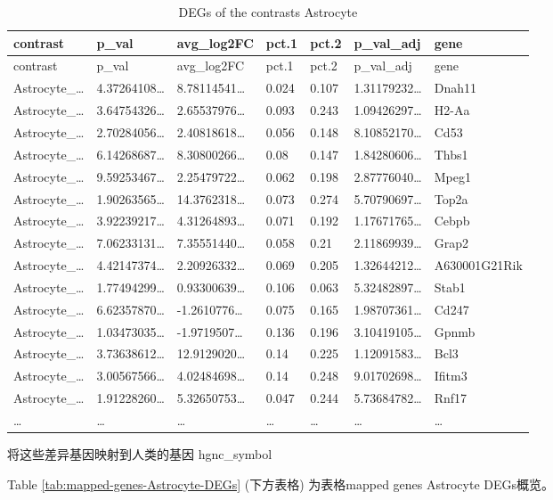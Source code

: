 \documentclass[
]{article}
\begin{document}
\begin{longtable}[]{@{}lllllll@{}}
\caption{\label{tab:DEGs-of-the-contrasts-Astrocyte}DEGs of the contrasts Astrocyte}\tabularnewline
\toprule
contrast & p\_val & avg\_log2FC & pct.1 & pct.2 & p\_val\_adj & gene\tabularnewline
\midrule
\endfirsthead
\toprule
contrast & p\_val & avg\_log2FC & pct.1 & pct.2 & p\_val\_adj & gene\tabularnewline
\midrule
\endhead
Astrocyte\_\ldots{} & 4.37264108\ldots{} & 8.78114541\ldots{} & 0.024 & 0.107 & 1.31179232\ldots{} & Dnah11\tabularnewline
Astrocyte\_\ldots{} & 3.64754326\ldots{} & 2.65537976\ldots{} & 0.093 & 0.243 & 1.09426297\ldots{} & H2-Aa\tabularnewline
Astrocyte\_\ldots{} & 2.70284056\ldots{} & 2.40818618\ldots{} & 0.056 & 0.148 & 8.10852170\ldots{} & Cd53\tabularnewline
Astrocyte\_\ldots{} & 6.14268687\ldots{} & 8.30800266\ldots{} & 0.08 & 0.147 & 1.84280606\ldots{} & Thbs1\tabularnewline
Astrocyte\_\ldots{} & 9.59253467\ldots{} & 2.25479722\ldots{} & 0.062 & 0.198 & 2.87776040\ldots{} & Mpeg1\tabularnewline
Astrocyte\_\ldots{} & 1.90263565\ldots{} & 14.3762318\ldots{} & 0.073 & 0.274 & 5.70790697\ldots{} & Top2a\tabularnewline
Astrocyte\_\ldots{} & 3.92239217\ldots{} & 4.31264893\ldots{} & 0.071 & 0.192 & 1.17671765\ldots{} & Cebpb\tabularnewline
Astrocyte\_\ldots{} & 7.06233131\ldots{} & 7.35551440\ldots{} & 0.058 & 0.21 & 2.11869939\ldots{} & Grap2\tabularnewline
Astrocyte\_\ldots{} & 4.42147374\ldots{} & 2.20926332\ldots{} & 0.069 & 0.205 & 1.32644212\ldots{} & A630001G21Rik\tabularnewline
Astrocyte\_\ldots{} & 1.77494299\ldots{} & 0.93300639\ldots{} & 0.106 & 0.063 & 5.32482897\ldots{} & Stab1\tabularnewline
Astrocyte\_\ldots{} & 6.62357870\ldots{} & -1.2610776\ldots{} & 0.075 & 0.165 & 1.98707361\ldots{} & Cd247\tabularnewline
Astrocyte\_\ldots{} & 1.03473035\ldots{} & -1.9719507\ldots{} & 0.136 & 0.196 & 3.10419105\ldots{} & Gpnmb\tabularnewline
Astrocyte\_\ldots{} & 3.73638612\ldots{} & 12.9129020\ldots{} & 0.14 & 0.225 & 1.12091583\ldots{} & Bcl3\tabularnewline
Astrocyte\_\ldots{} & 3.00567566\ldots{} & 4.02484698\ldots{} & 0.14 & 0.248 & 9.01702698\ldots{} & Ifitm3\tabularnewline
Astrocyte\_\ldots{} & 1.91228260\ldots{} & 5.32650753\ldots{} & 0.047 & 0.244 & 5.73684782\ldots{} & Rnf17\tabularnewline
\ldots{} & \ldots{} & \ldots{} & \ldots{} & \ldots{} & \ldots{} & \ldots{}\tabularnewline
\bottomrule
\end{longtable}

将这些差异基因映射到人类的基因 hgnc\_symbol

Table \ref{tab:mapped-genes-Astrocyte-DEGs} (下方表格) 为表格mapped genes Astrocyte DEGs概览。
\end{document}
